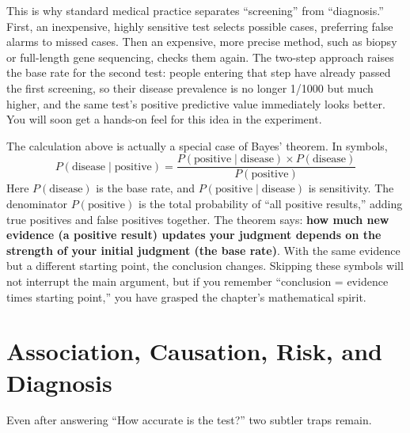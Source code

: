 This is why standard medical practice separates ``screening'' from ``diagnosis.'' First, an inexpensive, highly sensitive test selects possible cases, preferring false alarms to missed cases. Then an expensive, more precise method, such as biopsy or full-length gene sequencing, checks them again. The two-step approach raises the base rate for the second test: people entering that step have already passed the first screening, so their disease prevalence is no longer 1/1000 but much higher, and the same test's positive predictive value immediately looks better. You will soon get a hands-on feel for this idea in the experiment.

\begin{tiaozhan}
The calculation above is actually a special case of Bayes' theorem. In symbols,
\[P(\text{disease} \mid \text{positive}) = \frac{P(\text{positive} \mid \text{disease}) \times P(\text{disease})}{P(\text{positive})}\]
Here $P(\text{disease})$ is the base rate, and $P(\text{positive} \mid \text{disease})$ is sensitivity. The denominator $P(\text{positive})$ is the total probability of ``all positive results,'' adding true positives and false positives together. The theorem says: \textbf{how much new evidence (a positive result) updates your judgment depends on the strength of your initial judgment (the base rate)}. With the same evidence but a different starting point, the conclusion changes. Skipping these symbols will not interrupt the main argument, but if you remember ``conclusion = evidence times starting point,'' you have grasped the chapter's mathematical spirit.
\end{tiaozhan}

\section{Association, Causation, Risk, and Diagnosis}

Even after answering ``How accurate is the test?'' two subtler traps remain.

